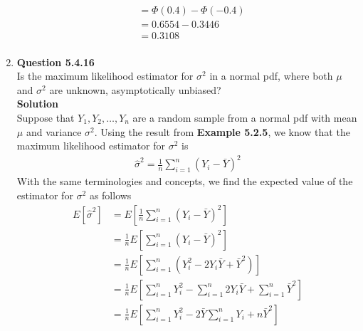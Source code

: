 \documentclass{uofa-eng-assignment}
\begin{document}
\begin{enumerate}
\begin{align*}
        \end{align*}
        \begin{align*}
             & = \Phi(0.4) - \Phi(-0.4) \\
             & = 0.6554 - 0.3446        \\
             & = \boldsymbol{0.3108}    \\
        \end{align*}
    \item[]
        \textbf{Question 5.4.16} \\
        Is the maximum likelihood estimator for $\sigma^2$ in a normal pdf, where both $\mu$ and $\sigma^2$
        are unknown, asymptotically unbiased? \\
        \textbf{Solution} \\
        Suppose that $Y_1, Y_2, \dots, Y_n$ are a random sample from a normal pdf with mean $\mu$ and
        variance $\sigma^2$. Using the result from \textbf{Example 5.2.5}, we know that the maximum
        likelihood estimator for $\sigma^2$ is
        \begin{align*}
            \hat{\sigma}^2 = \frac{1}{n} \sum_{i=1}^{n} (Y_i - \bar{Y})^2
        \end{align*}
        With the same terminologies and concepts, we find the expected value of the estimator for $\sigma^2$
        as follows
        \begin{align*}
            E[\hat{\sigma}^2] & = E\left[\frac{1}{n} \sum_{i=1}^{n} (Y_i - \bar{Y})^2\right]                                               \\
                              & = \frac{1}{n} E\left[\sum_{i=1}^{n} (Y_i - \bar{Y})^2\right]                                               \\
                              & = \frac{1}{n} E\left[\sum_{i=1}^{n} (Y_i^2 - 2 Y_i \bar{Y} + \bar{Y}^2)\right]                             \\
                              & = \frac{1}{n} E\left[\sum_{i=1}^{n} Y_i^2 - \sum_{i=1}^{n} 2 Y_i \bar{Y} + \sum_{i=1}^{n} \bar{Y}^2\right] \\
                              & = \frac{1}{n} E\left[\sum_{i=1}^{n} Y_i^2 - 2 \bar{Y} \sum_{i=1}^{n} Y_i + n \bar{Y}^2\right]              \\

\end{align*}
\end{enumerate}
\end{document}
